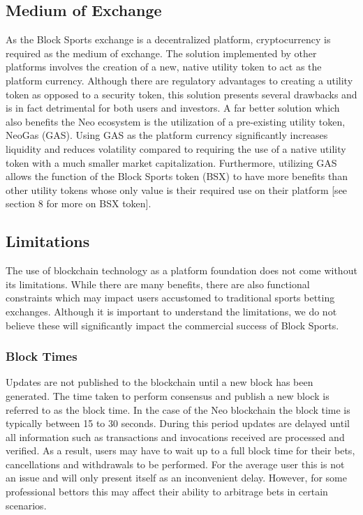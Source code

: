 \documentclass{article}
\begin{document}
	\subsection{Medium of Exchange}
As the Block Sports exchange is a decentralized platform, cryptocurrency is required as the medium of exchange. The solution implemented by other platforms involves the creation of a new, native utility token to act as the platform currency. Although there are regulatory advantages to creating a utility token as opposed to a security token, this solution presents several drawbacks and is in fact detrimental for both users and investors. A far better solution which also benefits the Neo ecosystem is the utilization of a pre-existing utility token, NeoGas (GAS). Using GAS as the platform currency significantly increases liquidity and reduces volatility compared to requiring the use of a native utility token with a much smaller market capitalization. Furthermore, utilizing GAS allows the function of the Block Sports token (BSX) to have more benefits than other utility tokens whose only value is their required use on their platform [see section 8 for more on BSX token].

	\subsection{Limitations}
The use of blockchain technology as a platform foundation does not come without its limitations. While there are many benefits, there are also functional constraints which may impact users accustomed to traditional sports betting exchanges. Although it is important to understand the limitations, we do not believe these will significantly impact the commercial success of Block Sports.  

		\subsubsection{Block Times}
Updates are not published to the blockchain until a new block has been generated. The time taken to perform consensus and publish a new block is referred to as the block time. In the case of the Neo blockchain the block time is typically between 15 to 30 seconds. During this period updates are delayed until all information such as transactions and invocations received are processed and verified. As a result, users may have to wait up to a full block time for their bets, cancellations and withdrawals to be performed. For the average user this is not an issue and will only present itself as an inconvenient delay. However, for some professional bettors this may affect their ability to arbitrage bets in certain scenarios.
\end{document}
